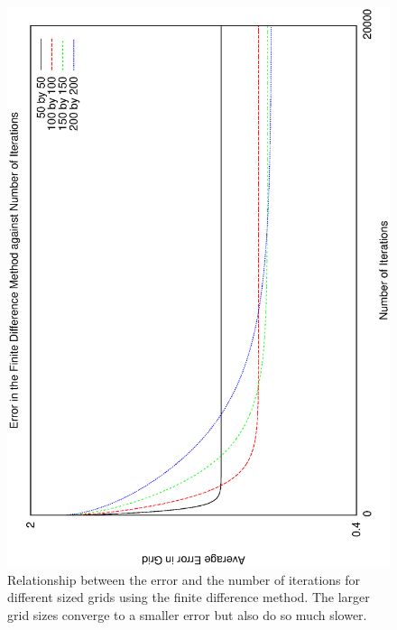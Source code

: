 \documentclass[aps,twocolumn,pre,nofootinbib,10pt]{revtex4-1}
\begin{document}
\begin{figure}
\includegraphics[height=\breite \columnwidth,angle=-90]{fd_it.eps}

\caption{Relationship between the error and the number of iterations for different sized grids using the finite difference method. The larger grid sizes converge to a smaller error but also do so much slower.}
\label{fig:fd}
\end{figure}
\end{document}

